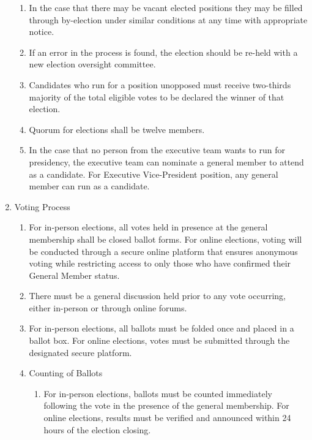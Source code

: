 \documentclass[12pt,a4paper]{article}
\begin{document}
\begin{enumerate}
\begin{enumerate}
\item In the case that there may be vacant elected positions they may be filled through by-election under similar conditions at any time with appropriate notice.

\item If an error in the process is found, the election should be re-held with a new election oversight committee.

\item Candidates who run for a position unopposed must receive two-thirds majority of the total eligible votes to be declared the winner of that election.

\item Quorum for elections shall be twelve members.

\item In the case that no person from the executive team wants to run for presidency, the executive team can nominate a general member to attend as a candidate. For Executive Vice-President position, any general member can run as a candidate.
\end{enumerate}

\item Voting Process

\begin{enumerate}
\item For in-person elections, all votes held in presence at the general membership shall be closed ballot forms. For online elections, voting will be conducted through a secure online platform that ensures anonymous voting while restricting access to only those who have confirmed their General Member status.

\item There must be a general discussion held prior to any vote occurring, either in-person or through online forums.

\item For in-person elections, all ballots must be folded once and placed in a ballot box. For online elections, votes must be submitted through the designated secure platform.

\item Counting of Ballots

\begin{enumerate}
\item For in-person elections, ballots must be counted immediately following the vote in the presence of the general membership. For online elections, results must be verified and announced within 24 hours of the election closing.


\end{enumerate}
\end{enumerate}
\end{enumerate}
\end{document}
